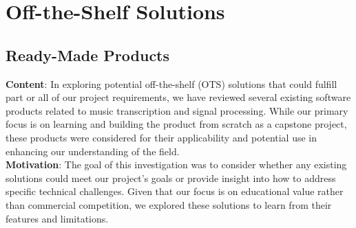 \documentclass[12pt]{article}
\begin{document}
\section{Off-the-Shelf Solutions}
\subsection{Ready-Made Products}
\textbf{Content}: In exploring potential off-the-shelf (OTS) solutions that could fulfill part or all of our project requirements, we have reviewed several existing software products related to music transcription and signal processing. While our primary focus is on learning and building the product from scratch as a capstone project, these products were considered for their applicability and potential use in enhancing our understanding of the field.\\
\textbf{Motivation}: The goal of this investigation was to consider whether any existing solutions could meet our project’s goals or provide insight into how to address specific technical challenges. Given that our focus is on educational value rather than commercial competition, we explored these solutions to learn from their features and limitations.\\
\end{document}
